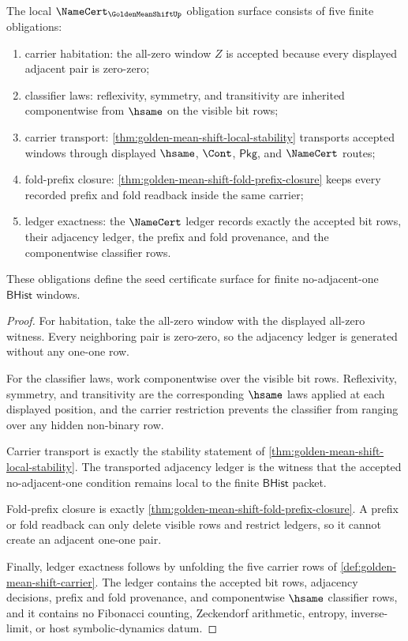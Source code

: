 \begin{theorem}
\label{thm:golden-mean-shift-namecert-obligation-surface}
The local $\NameCert_{\GoldenMeanShiftUp}$ obligation surface consists of five finite obligations:
\begin{enumerate}
\item carrier habitation: the all-zero window $Z$ is accepted because every displayed adjacent pair is zero-zero;
\item classifier laws: reflexivity, symmetry, and transitivity are inherited componentwise from $\hsame$ on the visible bit rows;
\item carrier transport: \autoref{thm:golden-mean-shift-local-stability} transports accepted windows through displayed $\hsame$, $\Cont$, $\mathsf{Pkg}$, and $\NameCert$ routes;
\item fold-prefix closure: \autoref{thm:golden-mean-shift-fold-prefix-closure} keeps every recorded prefix and fold readback inside the same carrier;
\item ledger exactness: the $\NameCert$ ledger records exactly the accepted bit rows, their adjacency ledger, the prefix and fold provenance, and the componentwise classifier rows.
\end{enumerate}
These obligations define the seed certificate surface for finite no-adjacent-one $\mathsf{BHist}$ windows.
\end{theorem}
\begin{proof}
For habitation, take the all-zero window with the displayed all-zero witness. Every neighboring pair is zero-zero, so the adjacency ledger is generated without any one-one row.

For the classifier laws, work componentwise over the visible bit rows. Reflexivity, symmetry, and transitivity are the corresponding $\hsame$ laws applied at each displayed position, and the carrier restriction prevents the classifier from ranging over any hidden non-binary row.

Carrier transport is exactly the stability statement of \autoref{thm:golden-mean-shift-local-stability}. The transported adjacency ledger is the witness that the accepted no-adjacent-one condition remains local to the finite $\mathsf{BHist}$ packet.

Fold-prefix closure is exactly \autoref{thm:golden-mean-shift-fold-prefix-closure}. A prefix or fold readback can only delete visible rows and restrict ledgers, so it cannot create an adjacent one-one pair.

Finally, ledger exactness follows by unfolding the five carrier rows of \autoref{def:golden-mean-shift-carrier}. The ledger contains the accepted bit rows, adjacency decisions, prefix and fold provenance, and componentwise $\hsame$ classifier rows, and it contains no Fibonacci counting, Zeckendorf arithmetic, entropy, inverse-limit, or host symbolic-dynamics datum.
\end{proof}

